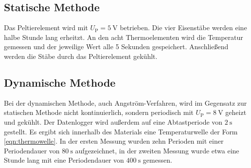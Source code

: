 \subsection{Statische Methode}
\label{sec:statische Methode}
Das Peltierelement wird mit $U_\text{P}=\SI{5}{\volt}$ betrieben.
Die vier Eisenstäbe werden eine halbe Stunde lang erheitzt.
An den acht Thermoelementen wird die Temperatur gemessen und der jeweilige Wert alle 5 Sekunden gespeichert.
Anschließend werden die Stäbe durch das Peltierelement gekühlt.
%
\subsection{Dynamische Methode}
\label{sec:dynamische Methode}
Bei der dynamischen Methode, auch Angström-Verfahren, wird im Gegensatz zur statischen Methode nicht kontinuierlich,
sondern periodisch mit $U_\text{P}=\SI{8}{\volt}$ geheizt und gekühlt.
Der Datenlogger wird außerdem auf eine Abtastperiode von $\SI{2}{\second}$ gestellt.
Es ergibt sich innerhalb des Materials eine Temperaturwelle der Form \eqref{eqn:thermowelle}.
In der ersten Messung wurden zehn Perioden mit einer Periodendauer von $\SI{80}{\second}$ aufgezeichnet,
in der zweiten Messung wurde etwa eine Stunde lang mit eine Periodendauer von $\SI{400}{\second}$ gemessen.
